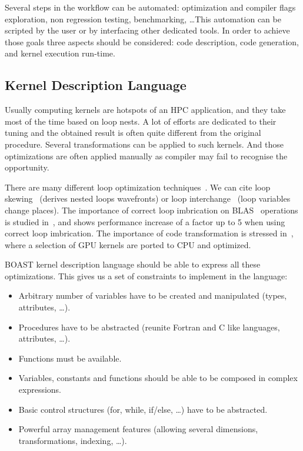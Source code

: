 \documentclass{IEEEtran}
\newcommand{\FD}[2]{\todo[inline, size=\small]{\textbf{FD$\rightarrow$#1}: #2.}}
\begin{document}
Several steps in the workflow can be automated: optimization and compiler flags
exploration, non regression testing, benchmarking, \ldots This automation can be
scripted by the user or by interfacing other dedicated tools. In order
to achieve those goals three aspects should be considered: code description,
code generation, and kernel execution run-time.

\subsection{Kernel Description Language}

Usually computing kernels are hotspots of an HPC application, and they take most
of the time based on loop nests. A lot of efforts are dedicated to their tuning
and the obtained result is often quite different from the original procedure.
Several transformations can be applied to such kernels. And those optimizations
are often applied manually as compiler may fail to recognise the opportunity.

There are many different loop optimization techniques~\cite{wolf1991loop}. We
can cite loop skewing~\cite{wolfe1986loops} (derives nested loops wavefronts)
or loop interchange~\cite{allen1984automatic} (loop variables change places).
The importance of  correct loop imbrication on BLAS~\cite{lawson1979basic} %
operations is studied in~\cite{soliman2009performance}, and shows performance
increase of a factor up to 5 when using correct loop imbrication. The
importance of code transformation is stressed in~\cite{ye2011porting}, where a
selection of GPU kernels are ported to CPU and optimized.

BOAST kernel description language should be able to express all these
optimizations. This gives us a set of constraints to implement in the language:
\begin{itemize}
\item Arbitrary number of variables have to be created and manipulated (types,
attributes, \ldots).
\item Procedures have to be abstracted (reunite Fortran and C like languages,
attributes, \ldots).
\item Functions must be available.
\item Variables, constants and functions should be able to be composed in
complex expressions.
\item Basic control structures (for, while, if/else, \ldots) have to be abstracted.
\item Powerful array management features (allowing several dimensions, transformations,
indexing, \ldots).
\end{itemize}
\end{document}

